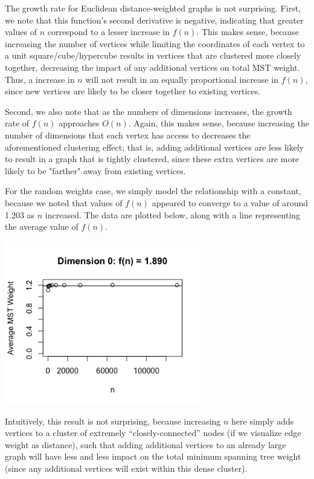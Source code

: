\documentclass[a4paper]{article}
\begin{document}
The growth rate for Euclidean distance-weighted graphs is not surprising. First, we note that this function's second derivative is negative, indicating that greater values of $n$ correspond to a lesser increase in $f(n)$. This makes sense, because increasing the number of vertices while limiting the coordinates of each vertex to a unit square/cube/hypercube results in vertices that are clustered more closely together, decreasing the impact of any additional vertices on total MST weight. Thus, a increase in $n$ will not result in an equally proportional increase in $f(n)$, since new vertices are likely to be closer together to existing vertices.

Second, we also note that as the numbers of dimensions increases, the growth rate of $f(n)$ approaches $O(n)$. Again, this makes sense, because increasing the number of dimensions that each vertex has access to decreases the aforementioned clustering effect; that is, adding additional vertices are less likely to result in a graph that is tightly clustered, since these extra vertices are more likely to be "farther" away from existing vertices.

For the random weights case, we simply model the relationship with a constant, because we noted that values of $f(n)$ appeared to converge to a value of around 1.203 as $n$ increased. The data are plotted below, along with a line representing the average value of $f(n)$.

\begin{center}
	\includegraphics[width=3.4in]{dim0plot}
\end{center}

Intuitively, this result is not surprising, because increasing $n$ here simply adds vertices to a cluster of extremely ``closely-connected'' nodes (if we visualize edge weight as distance), such that adding additional vertices to an already large graph will have less and less impact on the total minimum spanning tree weight (since any additional vertices will exist within this dense cluster).
\end{document}
